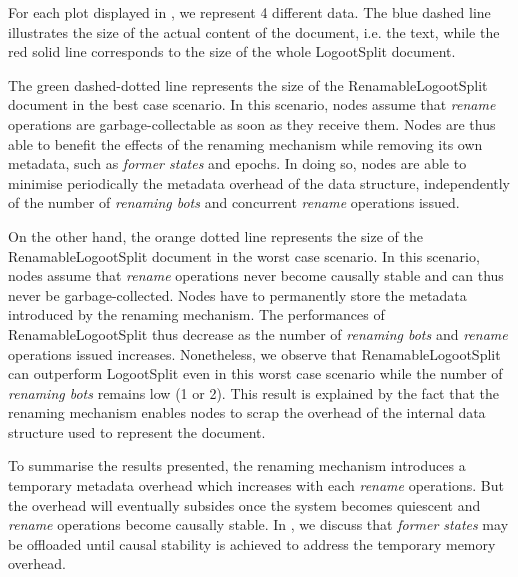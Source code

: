 \documentclass[10pt,journal,compsoc]{IEEEtran}
\newcommand{\ie}{i.e. }
\begin{document}
For each plot displayed in , we represent 4 different data.
The blue dashed line illustrates the size of the actual content of the document, \ie the text, while the red solid line corresponds to the size of the whole LogootSplit document.

The green dashed-dotted line represents the size of the RenamableLogootSplit document in the best case scenario.
In this scenario, nodes assume that \emph{rename} operations are garbage-collectable as soon as they receive them.
Nodes are thus able to benefit the effects of the renaming mechanism while removing its own metadata, such as \emph{former states} and epochs.
In doing so, nodes are able to minimise periodically the metadata overhead of the data structure, independently of the number of \emph{renaming bots} and concurrent \emph{rename} operations issued.

On the other hand, the orange dotted line represents the size of the RenamableLogootSplit document in the worst case scenario.
In this scenario, nodes assume that \emph{rename} operations never become causally stable and can thus never be garbage-collected.
Nodes have to permanently store the metadata introduced by the renaming mechanism.
The performances of RenamableLogootSplit thus decrease as the number of \emph{renaming bots} and \emph{rename} operations issued increases.
Nonetheless, we observe that RenamableLogootSplit can outperform LogootSplit even in this worst case scenario while the number of \emph{renaming bots} remains low (1 or 2).
This result is explained by the fact that the renaming mechanism enables nodes to scrap the overhead of the internal data structure used to represent the document.

To summarise the results presented, the renaming mechanism introduces a temporary metadata overhead which increases with each \emph{rename} operations.
But the overhead will eventually subsides once the system becomes quiescent and \emph{rename} operations become causally stable.
In , we discuss that \emph{former states} may be offloaded until causal stability is achieved to address the temporary memory overhead.
\end{document}
